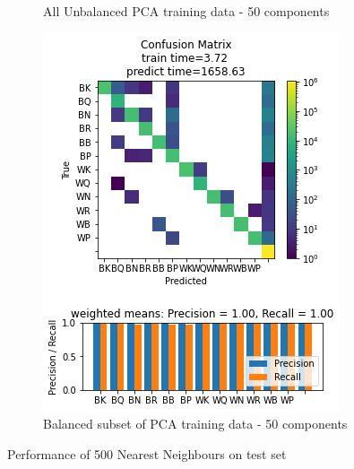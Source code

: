 \documentclass{article}
\newcommand{\FIGLABEL}[1]{Performance of #1 on test set}
\newcommand{\PCAFL}{All Unbalanced PCA training data - 50 components}
\newcommand{\PCABL}{Balanced subset of PCA training data - 50 components}
\begin{document}
\begin{figure}[h]
\begin{subfigure}{0.33\textwidth}
\caption{\PCAFL}
\end{subfigure}
\begin{subfigure}{0.33\textwidth}
\includegraphics[width=0.9\linewidth]{500NN_B_PCA50c_160x160_evaluation.png} 
\caption{\PCABL}
\end{subfigure}
\caption{\FIGLABEL{500 Nearest Neighbours}}
\label{fig:500NN}
\end{figure}

\end{document}

